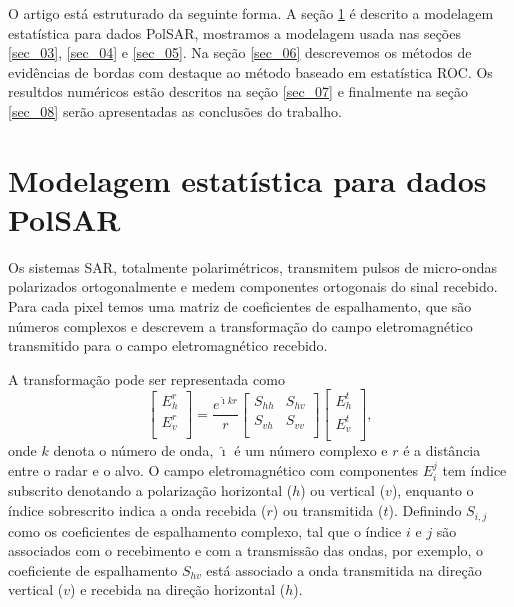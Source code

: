 \documentclass[conference]{IEEEtran}
\begin{document}
O artigo está estruturado da seguinte forma. A seção \ref{sec_02} é descrito a modelagem estatística para dados PolSAR, mostramos a modelagem usada nas seções \ref{sec_03}, \ref{sec_04} e \ref{sec_05}. Na seção \ref{sec_06} descrevemos os métodos de evidências de bordas com destaque ao método baseado em estatística ROC. Os resultdos numéricos estão descritos na seção \ref{sec_07} e finalmente na seção \ref{sec_08} serão apresentadas as conclusões do trabalho. 
\section{Modelagem estatística para dados PolSAR}\label{sec_02}
Os sistemas SAR, totalmente polarimétricos, transmitem pulsos de micro-ondas polarizados ortogonalmente e medem componentes ortogonais do sinal recebido. Para cada pixel temos uma matriz de coeficientes de espalhamento, que são números complexos e descrevem a transformação do campo eletromagnético transmitido para o campo eletromagnético recebido.

A transformação pode ser representada como
\begin{equation*}
 \left[
\begin{array}{c}
	E_{h}^{r}   \\
	E_{v}^{r}    \\
\end{array}
\right]
 = \frac{e^{\hat{\imath} kr}}{r}\left[
\begin{array}{cc}
	S_{hh}   & S_{hv}   \\
	S_{vh}   & S_{vv}   \\
\end{array}
\right]
 \left[
\begin{array}{c}
	E_{h}^{t}   \\
	E_{v}^{t}    \\
\end{array}
\right],
\end{equation*}
onde $k$ denota o número de onda, $\hat{\imath}$ é um número complexo e $r$ é a distância entre o radar e o alvo. O campo eletromagnético com componentes $E_{i}^{j}$ tem índice subscrito denotando a polarização horizontal ($h$) ou vertical ($v$),  enquanto o índice sobrescrito indica a onda recebida ($r$) ou transmitida ($t$). Definindo $S_{i,j}$ como os coeficientes de espalhamento complexo, tal que o índice $i$ e $j$ são associados com o recebimento e com a transmissão das ondas, por exemplo, o coeficiente de espalhamento $S_{hv}$ está associado a onda transmitida na direção vertical ($v$) e recebida na direção horizontal ($h$).
\end{document}
